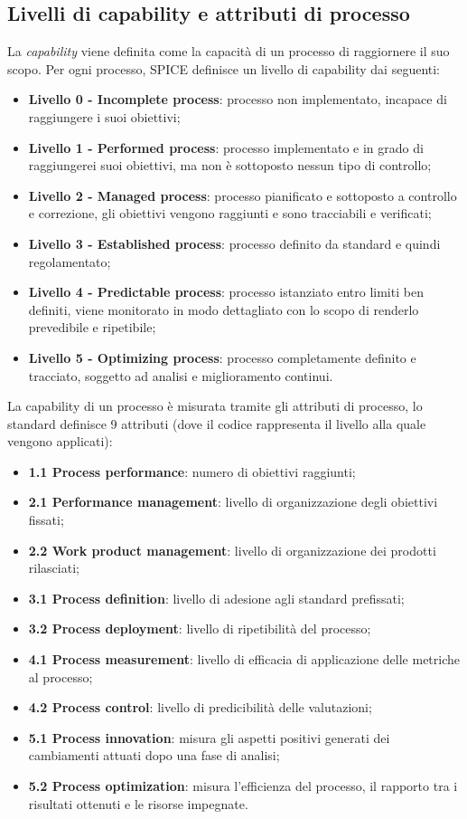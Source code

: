 \subsection{Livelli di capability e attributi di processo}
La \textit{capability} viene definita come la capacità di un processo di raggiornere il suo scopo.
Per ogni processo, SPICE definisce un livello di capability dai seguenti:
\begin{itemize}
  \item \textbf{Livello 0 - Incomplete process}: processo non implementato, incapace di raggiungere i suoi obiettivi;
  \item \textbf{Livello 1 - Performed process}: processo implementato e in grado di raggiungerei suoi obiettivi, ma non è sottoposto  nessun tipo di controllo; 
  \item \textbf{Livello 2 - Managed process}: processo pianificato e sottoposto a controllo e correzione, gli obiettivi vengono raggiunti e sono tracciabili e verificati;
  \item \textbf{Livello 3 - Established process}: processo definito da standard e quindi regolamentato;
  \item \textbf{Livello 4 - Predictable process}: processo istanziato entro limiti ben definiti, viene monitorato in modo dettagliato con lo scopo di renderlo prevedibile e ripetibile;
  \item \textbf{Livello 5 - Optimizing process}: processo completamente definito e tracciato, soggetto ad analisi e miglioramento continui.
\end{itemize}
La capability di un processo è misurata tramite gli attributi di processo, lo standard definisce 9 attributi (dove il codice rappresenta il livello alla quale vengono applicati):
\begin{itemize}
  \item \textbf{1.1 Process performance}: numero di obiettivi raggiunti;
  \item \textbf{2.1 Performance management}: livello di organizzazione degli obiettivi fissati;
  \item \textbf{2.2 Work product management}: livello di organizzazione dei prodotti rilasciati;
  \item \textbf{3.1 Process definition}: livello di adesione agli standard prefissati;
  \item \textbf{3.2 Process deployment}: livello di ripetibilità del processo;
  \item \textbf{4.1 Process measurement}: livello di efficacia di applicazione delle metriche al processo;
  \item \textbf{4.2 Process control}: livello di predicibilità delle valutazioni;
  \item \textbf{5.1 Process innovation}: misura gli aspetti positivi generati dei cambiamenti attuati dopo una fase di analisi;
  \item \textbf{5.2 Process optimization}: misura l'efficienza del processo, il rapporto tra i risultati ottenuti e le risorse impegnate.  
\end{itemize}


